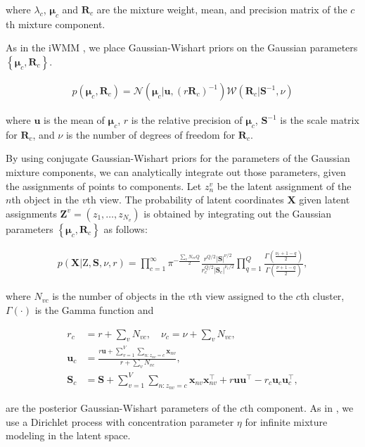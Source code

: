 \documentclass[]{article}
\newcommand{\gD}[2]{\mathcal{N}\left(#1,#2\right)}
\newcommand{\Z}{\boldsymbol{\mathrm{Z}}}
\newcommand{\Scluster}{\mathbf{S}}
\newcommand{\setZv}{\mathbf{Z}^{v}}
\newcommand{\setX}{\mathbf{X}}
\newcommand{\lambdac}{\lambda_c}
\newcommand{\muC}{\boldsymbol{\mu}_c}
\newcommand{\RC}{\mathbf{R}_c}
\begin{document}
where $\lambdac$, $\muC$ and $\RC$ are the mixture weight, mean, and
precision matrix of the $c$th mixture component.

As in the iWMM \cite{IwaDuvGha2012warped}, we
place Gaussian-Wishart priors on the Gaussian parameters $\left\{\muC,\RC\right\}$.

\begin{align}
p\left(\muC,\RC\right) = \gD{\muC|\mathbf{u}}{(r\RC)^{-1}}\mathcal{W}\left(\RC|\mathbf{S}^{-1},\nu\right)
\end{align}

where $\mathbf{u}$ is the mean of $\muC$, $r$ is the relative precision of $\muC$, $\mathbf{S}^{-1}$ is the scale matrix for $\RC$, and $\nu$ is the number of degrees of freedom for $\RC$.


By using conjugate Gaussian-Wishart priors for the parameters
of the Gaussian mixture components, we can analytically
integrate out those parameters, given the assignments
of points to components. Let $z_n^{v}$ be the latent assignment
of the $n$th object in the $v$th view. The probability of latent coordinates $\mathbf{X}$ given latent assignments $\setZv = \left(z_1,\dots,z_{N_v}\right)$ is obtained by integrating out the Gaussian parameters $\left\{\muC,\RC\right\}$ as follows:


\begin{align}
p\left(\setX|\Z,\Scluster,\nu,r\right) = \prod_{c=1}^{\infty} \pi^{-\frac{\sum_v N_{vc}Q}{2}}\frac{r^{Q/2}|\Scluster|^{\nu/2}}{r_c^{Q/2}|\Scluster_c|^{\nu_c/2}}\prod_{q=1}^{Q}\frac{\Gamma\left(\frac{\nu_c + 1 -q}{2}\right)}{\Gamma\left(\frac{\nu + 1 -q}{2}\right)},
\end{align}

where $N_{vc}$ is the number of objects in the $v$th view assigned to the $c$th cluster, $\Gamma\left(\cdot\right)$ is the Gamma function and

\begin{align*}
r_c &= r + \sum_v N_{vc},\quad \nu_c = \nu + \sum_v N_{vc},\\
\mathbf{u}_c & = \frac{r\mathbf{u}+\sum_{v=1}^{V}\sum_{n:z_{nv} = c}\mathbf{x}_{nv}}{r+\sum_v N_{vc}},\\
\Scluster_c &= \Scluster + \sum_{v=1}^{V}\sum_{n:z_{nv} = c} \mathbf{x}_{nv}\mathbf{x}_{nv}^\top + r \mathbf{u}\mathbf{u}^\top - r_c \mathbf{u}_c\mathbf{u}_c^\top,
\end{align*}

are the posterior Gaussian-Wishart parameters of the
$c$th component. As in \cite{IwaDuvGha2012warped}, we use a Dirichlet process with concentration parameter $\eta$ for infinite mixture modeling in the latent space.
\end{document}
